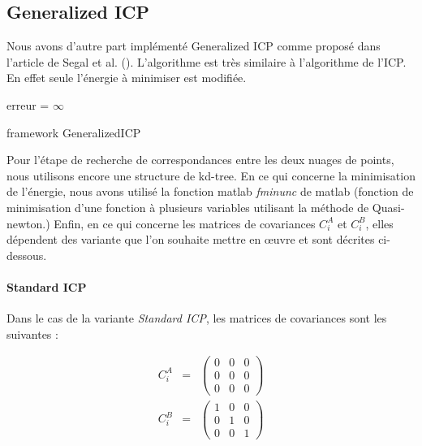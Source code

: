 \subsection{Generalized ICP}
\label{part:impl_gicp}
Nous avons d'autre part implémenté Generalized ICP comme proposé dans l'article de Segal et al. (\cite{bib_gicp}). L'algorithme est très similaire à l'algorithme de l'ICP. En effet seule l'énergie à minimiser est modifiée.\\

\begin{algorithm}[H]
erreur = $\infty$\;
\caption{framework GeneralizedICP}
\label{algo_gicp}
\end{algorithm}

Pour l'étape de recherche de correspondances entre les deux nuages de points, nous utilisons encore une structure de kd-tree. 
En ce qui concerne la minimisation de l'énergie, nous avons utilisé la fonction matlab \textit{fminunc} de matlab (fonction de minimisation d'une fonction à plusieurs variables utilisant la méthode de Quasi-newton.)
Enfin, en ce qui concerne les matrices de covariances $C_{i}^{A}$ et $C_{i}^{B}$, elles dépendent des variante que l'on souhaite mettre en œuvre et sont décrites ci-dessous.

\paragraph{Standard ICP}
Dans le cas de la variante \textit{Standard ICP}, les matrices de covariances sont les suivantes :

\begin{eqnarray}
C_{i}^A &=& 
\begin{pmatrix}
0 & 0 & 0\\
0 & 0 & 0\\
0 & 0 & 0
\end{pmatrix}\\
C_{i}^B &=& 
\begin{pmatrix}
1 & 0 & 0\\
0 & 1 & 0\\
0 & 0 & 1
\end{pmatrix}
\end{eqnarray}

